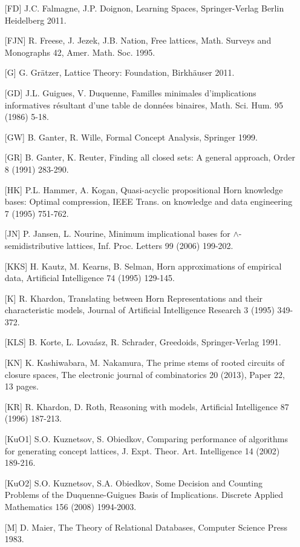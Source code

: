 \documentclass[11pt]{article}
\begin{document}
\begin{enumerate}
\item[{[FD]}] J.C. Falmagne, J.P. Doignon, Learning Spaces, Springer-Verlag Berlin Heidelberg 2011.
\item[{[FJN]}] R. Freese, J. Jezek, J.B. Nation, Free lattices, Math. Surveys and Monographs 42, Amer. Math. Soc. 1995.
\item[{[G]}] G. Gr\"{a}tzer, Lattice Theory: Foundation, Birkh\"{a}user 2011.
\item[{[GD]}] J.L. Guigues, V. Duquenne, Familles minimales d'implications informatives r\'{e}sultant d'une table de donn\'{e}es binaires, Math. Sci. Hum. 95 (1986) 5-18.
\item[{[GW]}] B. Ganter, R. Wille, Formal Concept Analysis, Springer 1999.
	\item[{[GR]}] B. Ganter, K. Reuter, Finding all closed sets: A general approach, Order 8 (1991) 283-290.
\item[{[HK]}] P.L. Hammer, A. Kogan, Quasi-acyclic propositional Horn knowledge bases: Optimal compression, IEEE Trans. on knowledge and data engineering 7 (1995) 751-762.
\item[{[JN]}] P. Jansen, L. Nourine, Minimum implicational bases for $\wedge$-semidistributive lattices, Inf. Proc. Letters 99 (2006) 199-202.
\item[{[KKS]}] H. Kautz, M. Kearns, B. Selman, Horn approximations of empirical data, Artificial Intelligence 74 (1995) 129-145.
\item[{[K]}] R. Khardon, Translating between Horn Representations and their characteristic models, Journal of Artificial Intelligence Research 3 (1995) 349-372.
\item[{[KLS]}] B. Korte, L. Lova\'{a}sz, R. Schrader, Greedoids, Springer-Verlag 1991.
\item[{[KN]}] K. Kashiwabara, M. Nakamura, The prime stems of rooted circuits of closure spaces, The electronic journal of combinatorics 20 (2013), Paper 22, 13 pages.
\item[{[KR]}] R. Khardon, D. Roth, Reasoning with models, Artificial Intelligence 87 (1996) 187-213.
\item[{[KuO1]}] S.O. Kuznetsov, S. Obiedkov, Comparing performance of algorithms for generating concept lattices, J. Expt. Theor. Art. Intelligence 14 (2002) 189-216.
\item[{[KuO2]}] S.O. Kuznetsov, S.A. Obiedkov, Some Decision and Counting Problems of the Duquenne-Guigues Basis of Implications. Discrete Applied Mathematics 156 (2008) 1994-2003.
\item[{[M]}] D. Maier, The Theory of Relational Databases, Computer Science Press 1983.

\end{enumerate}
\end{document}
